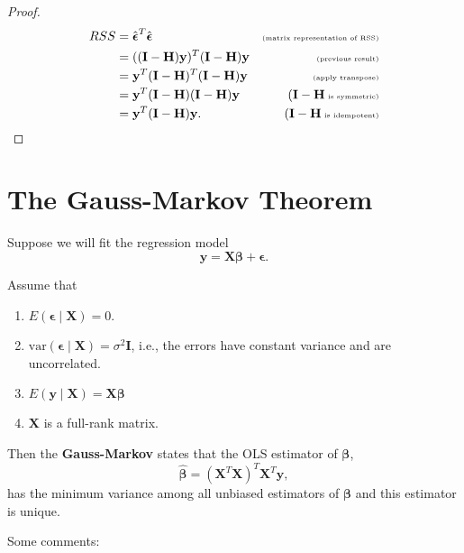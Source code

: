 \documentclass[
]{book}
\providecommand{\tightlist}{%
  \setlength{\itemsep}{0pt}\setlength{\parskip}{0pt}}
\theoremstyle{definition}
\theoremstyle{definition}
\theoremstyle{definition}
\theoremstyle{definition}
\theoremstyle{remark}
\begin{document}
\begin{proof}
\[
\begin{aligned}
RSS &= \hat{\boldsymbol{\epsilon}}^T\hat{\boldsymbol{\epsilon}}&\tiny\text{(matrix representation of RSS)}\\
&=((\mathbf{I}-\mathbf{H})\mathbf{y})^T(\mathbf{I}-\mathbf{H})\mathbf{y}&\tiny\text{(previous result)}\\
&=\mathbf{y}^T(\mathbf{I}-\mathbf{H})^T(\mathbf{I}-\mathbf{H})\mathbf{y}&\tiny\text{(apply transpose)}\\
&=\mathbf{y}^T(\mathbf{I}-\mathbf{H})(\mathbf{I}-\mathbf{H})\mathbf{y}&\tiny(\mathbf{I}-\mathbf{H} \text{ is symmetric)}\\
&=\mathbf{y}^T(\mathbf{I}-\mathbf{H})\mathbf{y}.&\tiny(\mathbf{I}-\mathbf{H} \text{ is idempotent)}\\
\end{aligned}
\]
\end{proof}

\hypertarget{the-gauss-markov-theorem}{%
\section{The Gauss-Markov Theorem}\label{the-gauss-markov-theorem}}

Suppose we will fit the regression model
\[
\mathbf{y}=\mathbf{X}\boldsymbol{\beta} + \boldsymbol{\epsilon}.
\]

Assume that

\begin{enumerate}
\def\labelenumi{\arabic{enumi}.}
\tightlist
\item
  \(E(\boldsymbol{\epsilon}\mid \mathbf{X}) = 0\).
\item
  \(\mathrm{var}(\boldsymbol{\epsilon}\mid \mathbf{X}) = \sigma^2 \mathbf{I}\), i.e., the errors have constant variance and are uncorrelated.
\item
  \(E(\mathbf{y}\mid \mathbf{X})=\mathbf{X}\boldsymbol{\beta}\)
\item
  \(\mathbf{X}\) is a full-rank matrix.
\end{enumerate}

Then the \textbf{Gauss-Markov} states that the OLS estimator of \(\boldsymbol{\beta}\),
\[
\hat{\boldsymbol{\beta}}=(\mathbf{X}^T\mathbf{X})^T\mathbf{X}^T\mathbf{y},
\]
has the minimum variance among all unbiased estimators of \(\boldsymbol{\beta}\) and this estimator is unique.

Some comments:
\end{document}
